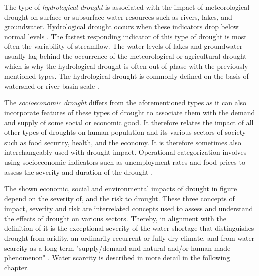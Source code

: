 The type of \textit{hydrological drought} is associated with the impact of meteorological drought on surface or subsurface water resources such as rivers, lakes, and groundwater. Hydrological drought occurs when these indicators drop below normal levels \autocite{palmerMeteorologicalDrought1965}. The fastest responding indicator of this type of drought is most often the variability of streamflow. The water levels of lakes and groundwater usually lag behind the occurrence of the meteorological or agricultural drought which is why the hydrological drought is often out of phase with the previously mentioned types. The hydrological drought is commonly defined on the basis of watershed or river basin scale \autocite{baltiReviewDroughtMonitoring2020,ndmcTypesDrought2023,wilhiteUnderstandingDroughtPhenomenon1985}.

The \textit{socioeconomic drought} differs from the aforementioned types as it can also incorporate features of these types of drought to associate them with the demand and supply of some social or economic good. It therefore relates the impact of all other types of droughts on human population and its various sectors of society such as food security, health, and the economy. It is therefore sometimes also interchangeably used with drought impact. Operational categorization involves using socioeconomic indicators such as unemployment rates and food prices to assess the severity and duration of the drought \autocite{ndmcTypesDrought2023,wilhiteUnderstandingDroughtPhenomenon1985}.


The shown economic, social and environmental impacts of drought in figure  depend on the severity of, and the risk to drought. These three concepts of impact, severity and risk are interrelated concepts used to assess and understand the effects of drought on various sectors. Thereby, in alignment with the definition of \autocite{vanloonDroughtHumanmodifiedWorld2016} it is the exceptional severity of the water shortage that distinguishes drought from aridity, an ordinarily recurrent or fully dry climate, and from water scarcity as a long-term "supply/demand and natural and/or human-made phenomenon" \autocites[7]{idmpDroughtWaterScarcity2022}{vereintenationenSpecialReportDrought2021, vanClimatologicalRiskDroughts2017}. Water scarcity is described in more detail in the following chapter.


